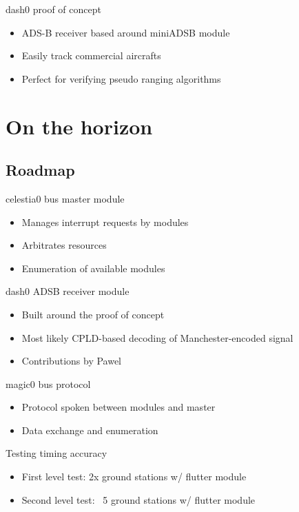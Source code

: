 	\begin{frame}{dash0 proof of concept}
		\begin{itemize}
			\item ADS-B receiver based around miniADSB module
			\item Easily track commercial aircrafts
			\item Perfect for verifying pseudo ranging algorithms
		\end{itemize}
	\end{frame}

\section{On the horizon}	

\subsection{Roadmap}
	\begin{frame}{celestia0 bus master module}
		\begin{itemize}
			\item Manages interrupt requests by modules
			\item Arbitrates resources
			\item Enumeration of available modules
		\end{itemize}
	\end{frame}
	\begin{frame}{dash0 ADSB receiver module}
		\begin{itemize}
			\item Built around the proof of concept
			\item Most likely CPLD-based decoding of Manchester-encoded signal
			\item Contributions by Pawel
		\end{itemize}
	\end{frame}
	\begin{frame}{magic0 bus protocol}
		\begin{itemize}
			\item Protocol spoken between modules and master
			\item Data exchange and enumeration
		\end{itemize}
	\end{frame}
	\begin{frame}{Testing timing accuracy}
		\begin{itemize}
			\item First level test: 2x ground stations w/ flutter module
			\item Second level test: ~5 ground stations w/ flutter module
		\end{itemize}
	\end{frame}
